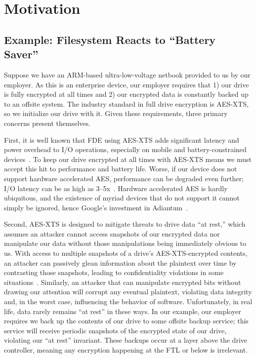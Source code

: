 \section{Motivation}\label{sec:motivation}

\subsection{Example: Filesystem Reacts to ``Battery Saver''}

Suppose we have an ARM-based ultra-low-voltage netbook provided to us by our
employer. As this is an enterprise device, our employer requires that 1) our
drive is fully encrypted at all times and 2) our encrypted data is constantly
backed up to an offsite system. The industry standard in full drive encryption
is AES-XTS, so we initialize our drive with it. Given these requirements, three
primary concerns present themselves.

First, it is well known that FDE using AES-XTS adds significant
latency and power overhead to I/O operations, especially on mobile and
battery-constrained devices~\cite{google-engadget,
  android-M-mobile-motivation, android-M-mobile-motivation-2}. To keep
our drive encrypted at all times with AES-XTS means we must accept
this hit to performance and battery life. Worse, if our device does
not support hardware accelerated AES, performance can be degraded even
further; I/O latency can be as high as 3--5x~\cite{StrongBox}.
Hardware accelerated AES is hardly ubiquitous, and the existence of
myriad devices that do not support it cannot simply be ignored, hence
Google's investment in Adiantum~\cite{Adiantum}. 

Second, AES-XTS is designed to mitigate threats to drive data ``at rest,''
which assumes an attacker cannot access snapshots of our encrypted data nor
manipulate our data without those manipulations being immediately obvious to us.
With access to multiple snapshots of a drive's AES-XTS-encrypted contents, an
attacker can passively glean information about the plaintext over time by
contrasting those snapshots, leading to confidentiality violations in some
situations~\cite{XEX, XTS}. Similarly, an attacker that can manipulate encrypted
bits without drawing our attention will corrupt any eventual plaintext,
violating data integrity and, in the worst case, influencing the behavior of
software. Unfortunately, in real life, data rarely remains ``at rest'' in these
ways. In our example, our employer requires we back up the contents of our drive
to some offsite backup service; this service will receive periodic snapshots of
the encrypted state of our drive, violating our ``at rest'' invariant. These
backups occur at a layer above the drive controller, meaning any encryption
happening at the FTL or below is irrelevant.

